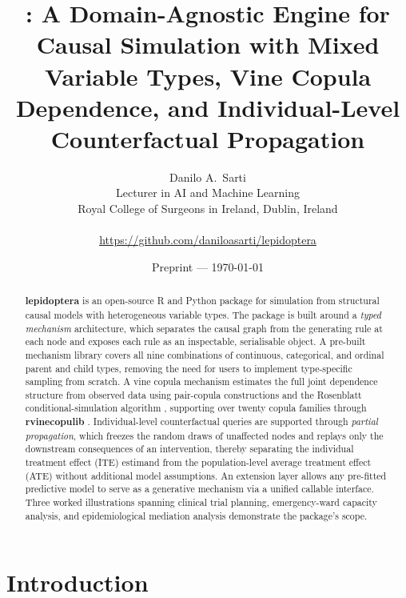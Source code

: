 \documentclass[12pt]{article}
\title{\textbf{\pkg{lepidoptera}: A Domain-Agnostic Engine for Causal Simulation
  with Mixed Variable Types, Vine Copula Dependence,
  and Individual-Level Counterfactual Propagation}}
\author{Danilo A.~Sarti\\[4pt]
  \small Lecturer in AI and Machine Learning\\
  \small Royal College of Surgeons in Ireland, Dublin, Ireland\\
  \small \email{danilosarti@rcsi.ie}\\
  \small \url{https://github.com/daniloasarti/lepidoptera}}
\date{\small Preprint — \today}
\newcommand{\pkg}[1]{\textbf{#1}}
\newcommand{\proglang}[1]{\textsf{#1}}
\begin{document}
\maketitle


\begin{abstract}
\pkg{lepidoptera} is an open-source \proglang{R} and \proglang{Python} package
for simulation from structural causal models with heterogeneous variable types.
The package is built around a \emph{typed mechanism} architecture, which separates
the causal graph from the generating rule at each node and exposes each rule as an
inspectable, serialisable object. A pre-built mechanism library covers all nine
combinations of continuous, categorical, and ordinal parent and child types,
removing the need for users to implement type-specific sampling from scratch. A
vine copula mechanism estimates the full joint dependence structure from observed
data using pair-copula constructions \citep{bedford2002vines, aas2009pair} and the
Rosenblatt conditional-simulation algorithm \citep{rosenblatt1952remarks},
supporting over twenty copula families through \pkg{rvinecopulib}
\citep{nagler2022rvinecopulib}. Individual-level counterfactual queries are
supported through \emph{partial propagation}, which freezes the random draws of
unaffected nodes and replays only the downstream consequences of an intervention,
thereby separating the individual treatment effect (ITE) estimand from the
population-level average treatment effect (ATE) without additional model
assumptions. An extension layer allows any pre-fitted predictive model to serve as
a generative mechanism via a unified callable interface. Three worked illustrations spanning
clinical trial planning, emergency-ward capacity analysis, and epidemiological
mediation analysis demonstrate the package's scope.
\end{abstract}

\section{Introduction}
\label{sec:intro}
\end{document}

